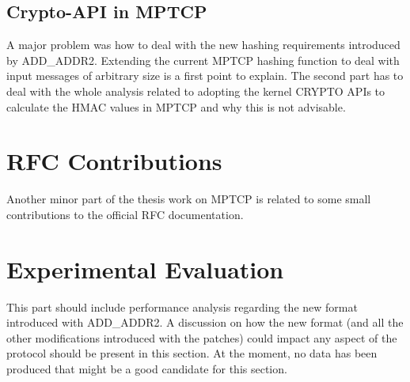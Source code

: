 \subsection{Crypto-API in MPTCP}
A major problem was how to deal with the new hashing requirements introduced by ADD\_ADDR2. Extending the current MPTCP hashing function to deal with input messages of arbitrary size is a first point to explain. The second part has to deal with the whole analysis related to adopting the kernel CRYPTO APIs to calculate the HMAC values in MPTCP and why this is not advisable.

\section{RFC Contributions}
Another minor part of the thesis work on MPTCP is related to some small contributions to the official RFC documentation.

\section{Experimental Evaluation}
This part should include performance analysis regarding the new format introduced with ADD\_ADDR2. A discussion on how the new format (and all the other modifications introduced with the patches) could impact any aspect of the protocol should be present in this section. At the moment, no data has been produced that might be a good candidate for this section.